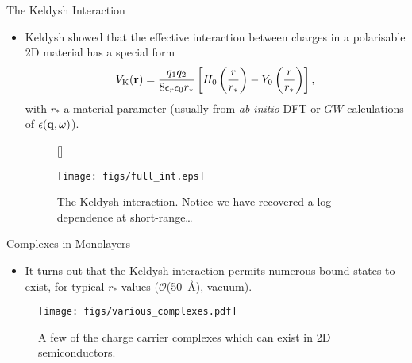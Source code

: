 \documentclass[12pt, pdf, hyperref={draft}, usenames, dvipsnames]{beamer}
\newcommand{\red}[1]{{\bf\color{LancsRed}{#1}}}
\newcommand{\green}[1]{{\bf\color{ForestGreen}{#1}}}
\begin{document}
%
%
\begin{frame}{The Keldysh Interaction}
\begin{itemize}
  \item Keldysh showed that the effective interaction
  between charges in a polarisable 2D material has a special form
  \begin{equation}
    V_{\text{K}}({\bf r}) = \dfrac{q_1q_2}{8\epsilon_r \epsilon_0 r_*}
    \left[ H_0\left(\frac{r}{r_*}\right) - Y_0\left(\frac{r}{r_*}\right)
    \right],
  \end{equation}
  with $r_*$ a material parameter (usually \red{inferred} from \textit{ab initio}
  DFT or $GW$ calculations of $\epsilon({\bf q},\omega)$).
  \begin{figure}[H]
    [\FBwidth]
    {\caption{The Keldysh interaction. Notice we have recovered a
    log-dependence at short-range\ldots}\label{fig:keldysh}}
    {\texttt{[image: figs/full\_int.eps]}}
  \end{figure}

\end{itemize}
\end{frame}

\begin{frame}{Complexes in Monolayers}
\begin{itemize}
  \item It turns out that the Keldysh interaction permits numerous bound states
  to exist, for typical $r_*$ values ($\mathcal{O}$(50\ \AA), vacuum).
\end{itemize}
\begin{figure}[H]
  \centering
  \texttt{[image: figs/various\_complexes.pdf]}
  \caption{A few of the charge carrier complexes which can exist in 2D
  semiconductors.}\label{fig:various_complexes}
\end{figure}
\end{frame}
\end{document}
